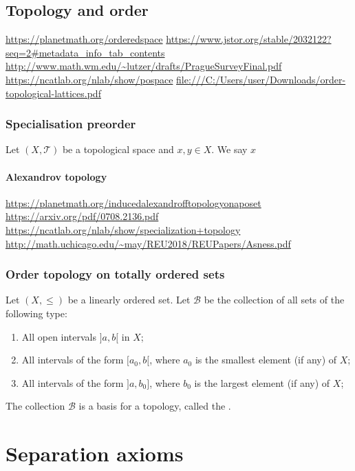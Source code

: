 \subsection{Topology and order}


\url{https://planetmath.org/orderedspace}
\url{https://www.jstor.org/stable/2032122?seq=2#metadata_info_tab_contents}
\url{http://www.math.wm.edu/~lutzer/drafts/PragueSurveyFinal.pdf}
\url{https://ncatlab.org/nlab/show/pospace}
\url{file:///C:/Users/user/Downloads/order-topological-lattices.pdf}

\subsubsection{Specialisation preorder}
\begin{definition}
Let $(X,\mathcal{T})$ be a topological space and $x,y\in X$. We say $x$
\end{definition}

\paragraph{Alexandrov topology}
\url{https://planetmath.org/inducedalexandrofftopologyonaposet}
\url{https://arxiv.org/pdf/0708.2136.pdf}
\url{https://ncatlab.org/nlab/show/specialization+topology}
\url{http://math.uchicago.edu/~may/REU2018/REUPapers/Asness.pdf}

\subsubsection{Order topology on totally ordered sets}
\begin{definition}
Let $(X,\leq)$ be a linearly ordered set. Let $\mathcal{B}$ be the collection of all sets of the following type:
\begin{enumerate}
\item All open intervals $]a,b[$ in $X$;
\item All intervals of the form $[a_0, b[$, where $a_0$ is the smallest element (if any) of $X$;
\item All intervals of the form $]a, b_0]$, where $b_0$ is the largest element (if any) of $X$;
\end{enumerate}
The collection $\mathcal{B}$ is a basis for a topology, called the .
\end{definition}


\section{Separation axioms}

